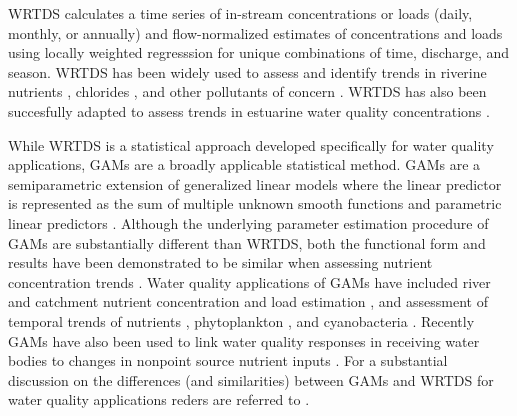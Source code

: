 \documentclass[fleqn,10pt,lineno]{wlpeerj} %
\begin{document}
WRTDS calculates a time series of in-stream concentrations or loads
(daily, monthly, or annually) and flow-normalized estimates of
concentrations and loads using locally weighted regresssion for unique
combinations of time, discharge, and season. WRTDS has been widely used
to assess and identify trends in riverine nutrients
\autocite{oelsner_recent_2019,stackpooleLongTermMississippi2021},
chlorides \autocite{stetsIncreasingChlorideRivers2018}, and other
pollutants of concern \autocite{shodaWaterqualityTrendsRivers2019}.
WRTDS has also been succesfully adapted to assess trends in estuarine
water quality concentrations \autocite{beckFourDecadesWater2018}.

While WRTDS is a statistical approach developed specifically for water
quality applications, GAMs are a broadly applicable statistical method.
GAMs are a semiparametric extension of generalized linear models where
the linear predictor is represented as the sum of multiple unknown
smooth functions and parametric linear predictors
\autocite{woodFastStableRestricted2011}. Although the underlying
parameter estimation procedure of GAMs are substantially different than
WRTDS, both the functional form and results have been demonstrated to be
similar when assessing nutrient concentration trends
\autocite{beckNumericalQualitativeContrasts2017}. Water quality
applications of GAMs have included river and catchment nutrient
concentration and load estimation
\autocite{wangLoadEstimationUncertainties2011,kroonRiverLoadsSuspended2012,kuhnertQuantifyingTotalSuspended2012,robson_prediction_2015-1,hagemannEstimatingNutrientOrganic2016,mcdowell_implications_2021,biagi_novel_2022},
and assessment of temporal trends of nutrients
\autocite{beckNumericalQualitativeContrasts2017,murphyGeneralizedAdditiveModel2019},
phytoplankton \autocite{bergbuschUnexpectedShiftPhytoplankton2021}, and
cyanobacteria \autocite{hayesEffectsLakeWarming2020}. Recently GAMs have
also been used to link water quality responses in receiving water bodies
to changes in nonpoint source nutrient inputs
\autocite{murphyNutrientImprovementsChesapeake2022}. For a substantial
discussion on the differences (and similarities) between GAMs and WRTDS
for water quality applications reders are referred to
\textcite{beckNumericalQualitativeContrasts2017}.
\end{document}
